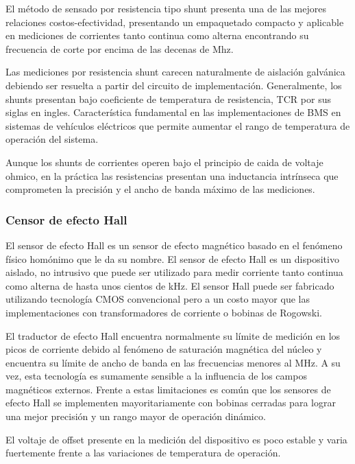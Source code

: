 \documentclass[10pt,a4paper]{article}
\begin{document}
	El método de sensado por resistencia tipo shunt presenta una de las mejores relaciones costos-efectividad, presentando un empaquetado compacto y aplicable en mediciones de corrientes tanto continua como alterna encontrando su frecuencia de corte por encima de las decenas de Mhz.
	
	Las mediciones por resistencia shunt carecen naturalmente de aislación galvánica debiendo ser resuelta a partir del circuito de implementación. Generalmente, los shunts presentan bajo coeficiente de temperatura de resistencia, TCR por sus siglas en ingles. Característica fundamental en las implementaciones de BMS en sistemas de vehículos eléctricos que permite aumentar el rango de temperatura de operación del sistema.
	
	Aunque los shunts de corrientes operen bajo el principio de caida de voltaje ohmico, en la práctica las resistencias presentan una inductancia intrínseca que comprometen la precisión y el ancho de banda máximo de las mediciones.
	
	\subsubsection{Censor de efecto Hall}
	El sensor de efecto Hall es un sensor de efecto magnético basado en el fenómeno físico homónimo que le da su nombre. 
	El sensor de efecto Hall es un dispositivo aislado, no intrusivo que puede ser utilizado para medir corriente tanto continua como alterna de hasta unos cientos de kHz. El sensor Hall puede ser fabricado utilizando tecnología CMOS convencional pero a un costo mayor que las implementaciones con transformadores de corriente o bobinas de Rogowski.
	
	El traductor de efecto Hall encuentra normalmente su límite de medición en los picos de corriente debido al fenómeno de saturación magnética del núcleo y encuentra su límite de ancho de banda en las frecuencias menores al MHz. A su vez, esta tecnología es sumamente sensible a la influencia de los campos magnéticos externos. Frente a estas limitaciones es común que los sensores de efecto Hall se implementen mayoritariamente con bobinas cerradas para lograr una mejor precisión y un rango mayor de operación dinámico.
	
	El voltaje de offset presente en la medición del dispositivo es poco estable y varia fuertemente frente a las variaciones de temperatura de operación.
	
\end{document}
